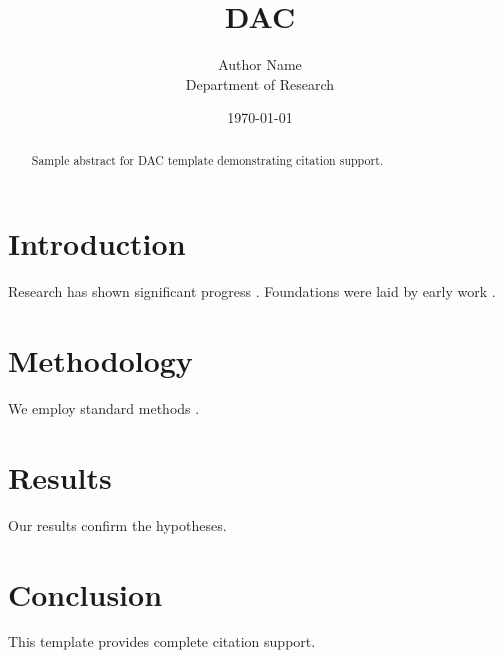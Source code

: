 \documentclass{article}
\title{DAC}
\author{Author Name \\ \small Department of Research}
\date{\today}
\begin{document}
\maketitle

\begin{abstract}
Sample abstract for DAC template demonstrating citation support.
\end{abstract}

\section{Introduction}
Research has shown significant progress \citep{einstein1905}. Foundations were laid by early work \citep{turing1950}.

\section{Methodology}
We employ standard methods \citep{knuth1984}.

\section{Results}
Our results confirm the hypotheses.

\section{Conclusion}
This template provides complete citation support.



\end{document}
